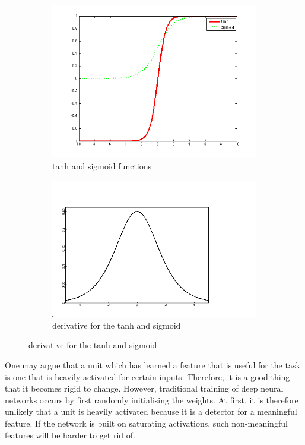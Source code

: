 \documentclass[a4paper,11pt]{article}
\begin{document}
\begin{figure}[h!]
	\centering
	\begin{subfigure}{.5\textwidth}
  		\centering
		\includegraphics[scale=0.4]{images/tanh_sigmoid.png}
		\caption{tanh and sigmoid functions}
	\end{subfigure}%
	\begin{subfigure}{.5\textwidth}
  		\centering
		\includegraphics[scale=0.4]{images/logistic_derivative.png}
		\caption{derivative for the tanh and sigmoid}
	\end{subfigure}
\end{figure}

One may argue that a unit which has learned a feature that is useful for the task is one that is heavily activated for certain inputs. Therefore, it is a good thing that it becomes rigid to change. However, traditional training of deep neural networks occurs by first randomly initialising the weights. At first, it is therefore unlikely that a unit is heavily activated because it is a detector for a meaningful feature. If the network is built on saturating activations, such non-meaningful features will be harder to get rid of. \\
\end{document}
